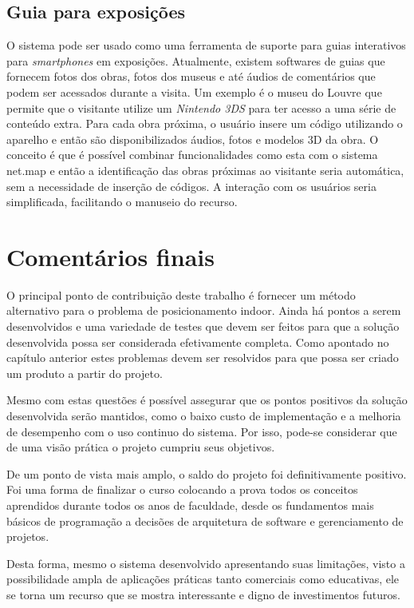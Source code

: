 \subsection{Guia para exposições}
O sistema pode ser usado como uma ferramenta de suporte para guias interativos para \textit{smartphones} em exposições. Atualmente, existem softwares de guias que fornecem fotos dos obras, fotos dos museus e até áudios de comentários que podem ser acessados durante a visita. Um exemplo é o museu do Louvre que permite que o visitante utilize um \textit{Nintendo 3DS} para ter acesso a uma série de conteúdo extra. Para cada obra próxima, o usuário insere um código utilizando o aparelho e então são disponibilizados áudios, fotos e modelos 3D da obra. O conceito é que é possível combinar funcionalidades como esta com o sistema net.map e então a identificação das obras próximas ao visitante seria automática, sem a necessidade de inserção de códigos. A interação com os usuários seria simplificada, facilitando o manuseio do recurso. 

\section{Comentários finais}

O principal ponto de contribuição deste trabalho é fornecer um método alternativo para o problema de posicionamento indoor. Ainda há pontos a serem desenvolvidos e uma variedade de testes que devem ser feitos para que a solução desenvolvida possa ser considerada efetivamente completa. Como apontado no capítulo anterior estes problemas devem ser resolvidos para que possa ser criado um produto a partir do projeto.\par
Mesmo com estas questões é possível assegurar que os pontos positivos da solução desenvolvida serão mantidos, como o baixo custo de implementação e a melhoria de desempenho com o uso continuo do sistema. Por isso, pode-se considerar que de uma visão prática o projeto cumpriu seus objetivos.\par
De um ponto de vista mais amplo, o saldo do projeto foi definitivamente positivo. Foi uma forma de finalizar o curso colocando a prova todos os conceitos aprendidos durante todos os anos de faculdade, desde os fundamentos mais básicos de programação a decisões de arquitetura de software e gerenciamento de projetos.\par
Desta forma, mesmo o sistema desenvolvido apresentando suas limitações, visto a possibilidade ampla de aplicações práticas tanto comerciais como educativas, ele se torna um recurso que se mostra interessante e digno de investimentos futuros.
